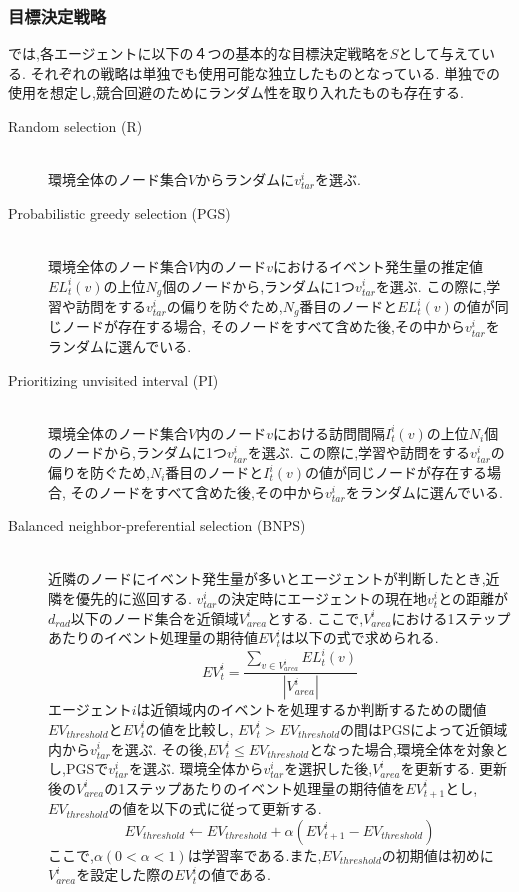 \documentclass[12pt,a4j,twoside]{jarticle}
\begin{document}
\subsubsection{目標決定戦略}
\label{target_strategy}
\cite{Yoneda2013}では,各エージェントに以下の４つの基本的な目標決定戦略を$S$として与えている.
それぞれの戦略は単独でも使用可能な独立したものとなっている.
単独での使用を想定し,競合回避のためにランダム性を取り入れたものも存在する.

\begin{description}
  \item[Random selection (R)]\mbox{}\\
  環境全体のノード集合$V$からランダムに$v^i_{tar}$を選ぶ.

  \item[Probabilistic greedy selection (PGS)]\mbox{} \\
  環境全体のノード集合$V$内のノード$v$におけるイベント発生量の推定値$EL^i_t(v)$の上位$N_g$個のノードから,ランダムに1つ$v^i_{tar}$を選ぶ.
  この際に,学習や訪問をする$v^i_{tar}$の偏りを防ぐため,$N_g$番目のノードと$EL^i_t(v)$の値が同じノードが存在する場合,
  そのノードをすべて含めた後,その中から$v^i_{tar}$をランダムに選んでいる.

  \item[Prioritizing unvisited interval (PI)]\mbox{} \\
  環境全体のノード集合$V$内のノード$v$における訪問間隔$I^i_t(v)$の上位$N_i$個のノードから,ランダムに1つ$v^i_{tar}$を選ぶ.
  この際に,学習や訪問をする$v^i_{tar}$の偏りを防ぐため,$N_i$番目のノードと$I^i_t(v)$の値が同じノードが存在する場合,
  そのノードをすべて含めた後,その中から$v^i_{tar}$をランダムに選んでいる.
  
  \item[Balanced neighbor-preferential selection (BNPS)]\mbox{} \\
  近隣のノードにイベント発生量が多いとエージェントが判断したとき,近隣を優先的に巡回する.
  $v^i_{tar}$の決定時にエージェントの現在地$v^i_t$との距離が$d_{rad}$以下のノード集合を近領域$V^i_{area}$とする.
  ここで,$V^i_{area}$における1ステップあたりのイベント処理量の期待値$EV^i_t$は以下の式で求められる.
  \begin{equation}
    EV^i_t = \frac{\displaystyle \sum_{v \in V^i_{area}}EL^i_t(v)}{|V^i_{area}|}  
  \end{equation}
  エージェント$i$は近領域内のイベントを処理するか判断するための閾値$EV_{threshold}$と$EV^i_t$の値を比較し,
  $EV^i_t > EV_{threshold}$の間はPGSによって近領域内から$v^i_{tar}$を選ぶ.
  その後,$EV^i_t \le EV_{threshold}$となった場合,環境全体を対象とし,PGSで$v^i_{tar}$を選ぶ.
  環境全体から$v^i_{tar}$を選択した後,$V^i_{area}$を更新する.
  更新後の$V^i_{area}$の1ステップあたりのイベント処理量の期待値を$EV^i_{t+1}$とし,$EV_{threshold}$の値を以下の式に従って更新する.
  \begin{equation}
    EV_{threshold} \gets EV_{threshold} + \alpha(EV^i_{t+1} - EV_{threshold})
  \end{equation}
  ここで,$\alpha(0 < \alpha < 1)$は学習率である.また,$EV_{threshold}$の初期値は初めに$V^i_{area}$を設定した際の$EV^i_t$の値である.
\end{description}
\end{document}
